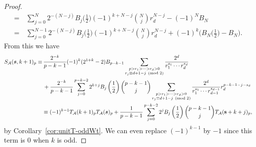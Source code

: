 \documentclass[10pt,a4paper]{amsart}
\newcommand{\bfs}{{\boldsymbol{\sl{s}}}}
\newcommand{\calA}{\mathcal{A}}
\begin{document}
\begin{proof}
\begin{align*}
=&\, \sum_{j=0}^{N}2^{-(N-j)}B_{j}\Big(\frac12\Big)(-1)^{k+N-j}\binom{N}{j}r_{d}^{N-j}-(-1)^N B_N \\
=&\, \sum_{j=0}^{N-1}2^{-(N-j)}B_{j}\Big(\frac12\Big)(-1)^{k+N-j}\binom{N}{j}r_{d}^{N-j}
+(-1)^k\Big(B_{N}\Big(\frac12\Big)- B_N\Big) .
\end{align*}
From this we have
\begin{align*}
S_\calA(\bfs,k+1)_p\equiv&\,
\frac{2^{-k}}{p-k-1}(-1)^k(2^{1+k}-2)B_{p-k-1}\sum_{\substack{p>r_1>\cdots >r_{d}>0\\r_j\equiv d+1-j\pmod 2}}\frac{2^{d}}{r_1^{s_1}\cdots r_d^{s_{d}}} \\ &\,+\frac{2^{-k}}{p-k-1}\sum_{j=0}^{p-k-2}2^{k+j}B_j\left(\frac12\right)\binom{p-k-1}{j}
\sum_{\substack{p>r_1>\cdots >r_{d}>0\\r_j\equiv d+1-j\pmod 2}}\frac{2^{d}}{r_1^{s_1}\cdots r_{d-1}^{s_{d-1}}}r_d^{p-k-1-j-s_{d}}\\
&\equiv (-1)^{k-1}T_\calA(k+1)_pT_\calA(\bfs)_p
+\frac{1}{p-k-1}\sum_{j=0}^{p-k-2}2^jB_j\left(\frac12\right)\binom{p-k-1}{j} T_{\calA}(\mathbf s+k+j)_p,
\end{align*}
by Corollary~\ref{cor:unitT-oddWt}. We can even replace $(-1)^{k-1}$ by $-1$ since this term is 0 when $k$ is odd.
\end{proof}
\end{document}

